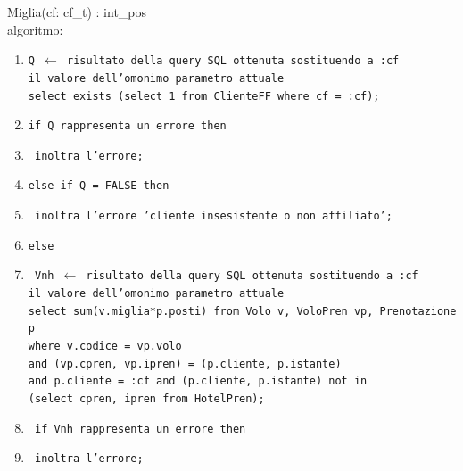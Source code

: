 \documentclass[a4paper,12pt]{report}
\begin{document}
        Miglia(cf: cf\_t) : int\_pos \\
        \hspace*{1cm}algoritmo:
        \begin{enumerate}[label*=\arabic*]
          \item \texttt{Q $\leftarrow$ risultato della query SQL ottenuta sostituendo a :cf \\
            \hspace*{1cm} il valore dell'omonimo parametro attuale \\
            \hspace*{1cm} select exists (select 1 from ClienteFF where cf = :cf);}
          \item \texttt{if Q rappresenta un errore then}
          \item \texttt{\hspace*{1cm} inoltra l'errore;}
          \item \texttt{else if Q = FALSE then}
          \item \texttt{\hspace*{1cm} inoltra l'errore 'cliente insesistente o non affiliato';}
          \item \texttt{else}
          \item \texttt{\hspace*{1cm} Vnh $\leftarrow$ risultato della query SQL ottenuta sostituendo a :cf \\
            \hspace*{2cm} il valore dell'omonimo parametro attuale \\
            \hspace*{2cm} select sum(v.miglia*p.posti) from Volo v, VoloPren vp, Prenotazione p \\
            \hspace*{3cm} where v.codice = vp.volo \\
            \hspace*{3cm} and (vp.cpren, vp.ipren) = (p.cliente, p.istante) \\
            \hspace*{3cm} and p.cliente = :cf and (p.cliente, p.istante) not in \\
            \hspace*{4cm} (select cpren, ipren from HotelPren);}
          \item \texttt{\hspace*{1cm} if Vnh rappresenta un errore then}
          \item \texttt{\hspace*{2cm} inoltra l'errore;}

\end{enumerate}
\end{document}

